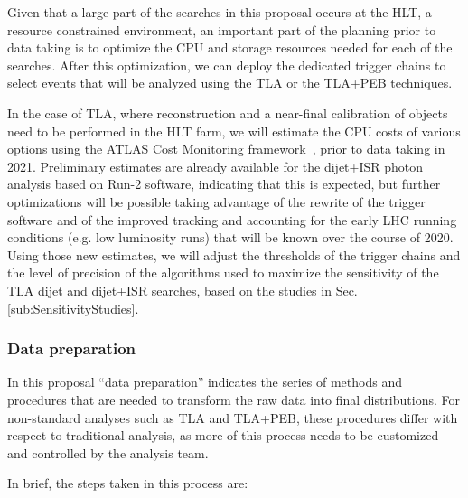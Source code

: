 Given that a large part of the searches in this proposal occurs at the HLT, a resource constrained environment, an important part of the planning prior to data taking is to optimize the CPU and storage resources needed for each of the searches. After this optimization, we can deploy the dedicated trigger chains to select events that will be analyzed using the TLA or the TLA+PEB techniques. 

In the case of TLA, where reconstruction and a near-final calibration of objects need to be performed in the HLT farm, we will estimate the CPU costs of various options using the ATLAS Cost Monitoring framework~\cite{CostMonitoringTim}, prior to data taking in 2021.  
Preliminary estimates are already available for the dijet+ISR photon analysis based on Run-2 software, indicating that this is expected, but further optimizations will be possible taking advantage of the rewrite of the trigger software and of the improved tracking and accounting for the early LHC running conditions (e.g. low luminosity runs) that will be known over the course of 2020. Using those new estimates, we will adjust the thresholds of the trigger chains and the level of precision of the algorithms used to maximize the sensitivity of the TLA dijet and dijet+ISR searches, based on the studies in Sec.\ref{sub:SensitivityStudies}. 
 



\subsubsection{Data preparation}


In this proposal “data preparation” indicates the series of methods and procedures that are needed to transform the raw data into final distributions. For non-standard analyses such as TLA and TLA+PEB, these procedures differ with respect to traditional analysis, as more of this process needs to be customized and controlled by the analysis team. 

In brief, the steps taken in this process are:

